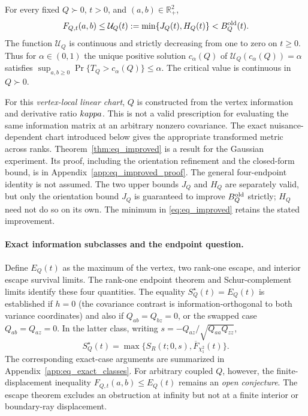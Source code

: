 \begin{theorem}\label{thm:eq_improved}
For every fixed $Q\succ0$, $t>0$, and $(a,b)\in\mathbb R_+^2$,
\begin{equation}\label{eq:eq_improved}
 F_{Q,t}(a,b)\leq \mathcal U_Q(t):=\min\{J_Q(t),H_Q(t)\}
 <B_Q^{\rm old}(t).
\end{equation}
The function $\mathcal U_Q$ is continuous and strictly decreasing from
one to zero on $t\geq0$. Thus for $\alpha\in(0,1)$ the unique positive
solution $c_\alpha(Q)$ of $\mathcal U_Q(c_\alpha(Q))=\alpha$
satisfies $\sup_{a,b\geq0}\Pr\{T_Q>c_\alpha(Q)\}\leq\alpha$.
The critical value is continuous in $Q\succ0$.
\end{theorem}
For this \emph{vertex-local linear chart}, $Q$ is constructed from
the vertex information and derivative ratio $\\kappa$. This is not a
valid prescription for evaluating the same information matrix at an
arbitrary nonzero covariance. The exact nuisance-dependent chart
introduced below gives the appropriate transformed metric across ranks.
Theorem~\ref{thm:eq_improved} is a result for the Gaussian experiment.
Its proof, including the orientation refinement and the closed-form bound,
is in Appendix~\ref{app:eq_improved_proof}. The general four-endpoint
identity is not assumed. The two upper bounds $J_Q$ and $H_Q$ are
separately valid, but only the orientation bound $J_Q$ is guaranteed
to improve $B_Q^{\rm old}$ strictly; $H_Q$ need not do so on its own.
The minimum in \eqref{eq:eq_improved} retains the stated improvement.

\paragraph{Exact information subclasses and the endpoint question.}
Define $E_Q(t)$ as the maximum of the vertex, two rank-one escape,
and interior escape survival limits. The rank-one endpoint theorem and
Schur-complement limits identify these four quantities. The equality
$S_Q^\star(t)=E_Q(t)$ is established if $h=0$ (the covariance contrast
is information-orthogonal to both variance coordinates) and also if
$Q_{ab}=Q_{bz}=0$, or the swapped case $Q_{ab}=Q_{az}=0$.
In the latter class, writing $s=-Q_{az}/\sqrt{Q_{aa}Q_{zz}}$,
\begin{equation}\label{eq:eq_isolated_exact}
 S_Q^\star(t)=\max\{S_R(t;0,s),\overline F_{\chi_1^2}(t)\}.
\end{equation}
The corresponding exact-case arguments are summarized in
Appendix~\ref{app:eq_exact_classes}.
For arbitrary coupled $Q$, however, the finite-displacement inequality
$F_{Q,t}(a,b)\leq E_Q(t)$ remains an \emph{open conjecture}.
The escape theorem excludes an obstruction at infinity but not at a
finite interior or boundary-ray displacement.

